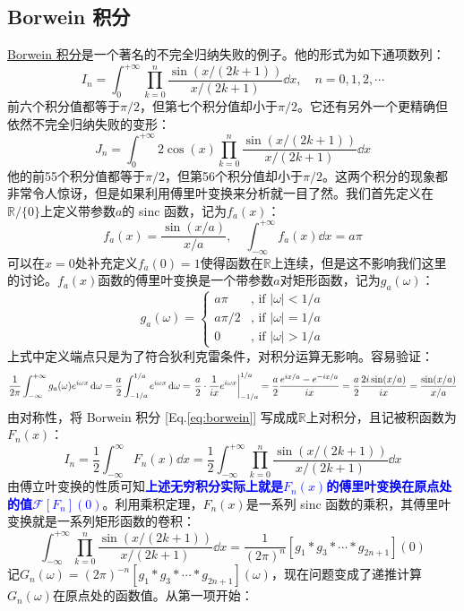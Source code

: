 \subsection{Borwein 积分}
\href{https://en.wikipedia.org/wiki/Borwein_integral}{Borwein 积分}是一个著名的不完全归纳失败的例子。他的形式为如下通项数列：
\begin{equation}\label{eq:borwein}
I_n=\int_0^{+\infty}\prod_{k=0}^{n}\frac{\sin\left(x/(2k+1)\right)}{x/(2k+1)}\dd{x}, \quad n=0,1,2,\cdots
\end{equation}
前六个积分值都等于$\pi/2$，但第七个积分值却小于$\pi/2$。它还有另外一个更精确但依然不完全归纳失败的变形：
\[J_n=\int_0^{+\infty}2\cos(x)\prod_{k=0}^{n}\frac{\sin\left(x/(2k+1)\right)}{x/(2k+1)}\dd x\]
他的前55个积分值都等于$\pi/2$，但第56个积分值却小于$\pi/2$。这两个积分的现象都非常令人惊讶，但是如果利用傅里叶变换来分析就一目了然。我们首先定义在$\mathbb{R}/\{0\}$上定义带参数$a$的 sinc 函数，记为$f_a(x)$：
\[f_a(x)=\frac{\sin(x/a)}{x/a}, \quad \int_{-\infty}^{+\infty}f_a(x)\dd{x}=a\pi\]
可以在$x=0$处补充定义$f_a(0)=1$使得函数在$\mathbb{R}$上连续，但是这不影响我们这里的讨论。$f_a(x)$函数的傅里叶变换是一个带参数$a$对矩形函数，记为$g_a(\omega)$：
\[g_a(\omega)=\left\{
\begin{array}{ll}
a\pi & \text{, if } |\omega|<1/a\\ 
a\pi/2 & \text{, if } |\omega|=1/a\\ 
0 & \text{, if } |\omega|>1/a
\end{array}\right.\]
上式中定义端点只是为了符合狄利克雷条件，对积分运算无影响。容易验证：
\[\frac{1}{2\pi}\int_{-\infty}^{+\infty}g_a(\omega)e^{i\omega x}\dd{\omega}=\frac{a}{2}\int_{-1/a}^{1/a}e^{i\omega x}\dd{\omega}=\eval{\frac{a}{2}\cdot\frac{1}{ix}e^{i\omega x}}_{-1/a}^{1/a}=\frac{a}{2}\frac{e^{ix/a}-e^{-ix/a}}{ix}=\frac{a}{2}\frac{2i\sin(x/a)}{ix}=\frac{\sin(x/a)}{x/a}\]
由对称性，将 Borwein 积分 [Eq.\eqref{eq:borwein}] 写成成$\mathbb{R}$上对积分，且记被积函数为$F_n(x)$：
\[I_n=\frac{1}{2}\int_{-\infty}^{\infty}F_n(x)\dd{x}=\frac{1}{2}\int_{-\infty}^{+\infty}\prod_{k=0}^{n}\frac{\sin\left(x/(2k+1)\right)}{x/(2k+1)}\dd{x}\]
由傅立叶变换的性质可知\textcolor{blue}{\textbf{上述无穷积分实际上就是$F_n(x)$的傅里叶变换在原点处的值$\mathscr{F}[F_n](0)$}}。利用乘积定理，$F_n(x)$是一系列 sinc 函数的乘积，其傅里叶变换就是一系列矩形函数的卷积：
\[\int_{-\infty}^{+\infty}\prod_{k=0}^{n}\frac{\sin\left(x/(2k+1)\right)}{x/(2k+1)}\dd{x}=\frac{1}{(2\pi)^n}[g_1 \ast g_{3} \ast \cdots \ast g_{2n+1}](0)\]
记$G_n(\omega)=(2\pi)^{-n}[g_1 \ast g_{3} \ast \cdots \ast g_{2n+1}](\omega)$，现在问题变成了递推计算$G_n(\omega)$在原点处的函数值。从第一项开始：
